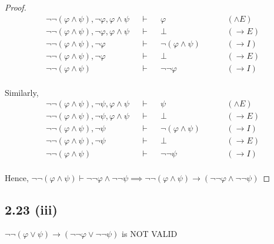 \documentclass[12pt]{article}
\begin{document}
\begin{proof}
\begin{align*}
    \neg \neg (\varphi \wedge \psi), \neg \varphi, \varphi \wedge \psi &&\vdash&& \varphi &&&& (\wedge E) \\
    \neg \neg (\varphi \wedge \psi), \neg \varphi, \varphi \wedge \psi &&\vdash&& \bot &&&& (\rightarrow E) \\
    \neg \neg (\varphi \wedge \psi), \neg \varphi &&\vdash&& \neg (\varphi \wedge \psi) &&&& (\rightarrow I) \\
    \neg \neg (\varphi \wedge \psi), \neg \varphi  &&\vdash&& \bot &&&& (\rightarrow E) \\
    \neg \neg (\varphi \wedge \psi) &&\vdash&& \neg \neg \varphi &&&& (\rightarrow I) \\
\end{align*}

Similarly,
\begin{align*}
    \neg \neg (\varphi \wedge \psi), \neg \psi, \varphi \wedge \psi &&\vdash&& \psi &&&& (\wedge E) \\
    \neg \neg (\varphi \wedge \psi), \neg \psi, \varphi \wedge \psi &&\vdash&& \bot &&&& (\rightarrow E) \\
    \neg \neg (\varphi \wedge \psi), \neg \psi &&\vdash&& \neg (\varphi \wedge \psi) &&&& (\rightarrow I) \\
    \neg \neg (\varphi \wedge \psi), \neg \psi  &&\vdash&& \bot &&&& (\rightarrow E) \\
    \neg \neg (\varphi \wedge \psi) &&\vdash&& \neg \neg \psi &&&& (\rightarrow I) \\
\end{align*}

Hence, $\neg \neg (\varphi \wedge \psi) \vdash \neg \neg \varphi \wedge \neg \neg \psi \implies \neg \neg (\varphi \wedge \psi) \rightarrow (\neg \neg \varphi \wedge \neg \neg \psi)$
\end{proof}

\subsection*{2.23 (iii)} 
$\neg \neg(\varphi \vee \psi) \rightarrow (\neg \neg \varphi \vee \neg \neg \psi)$ is NOT VALID
\end{document}
